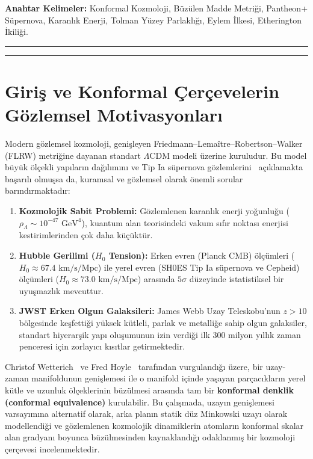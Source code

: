 \documentclass[11pt,a4paper]{article}
\begin{document}
\vspace{1em}
\noindent\textbf{Anahtar Kelimeler:} Konformal Kozmoloji, Büzülen Madde Metriği, Pantheon+ Süpernova, Karanlık Enerji, Tolman Yüzey Parlaklığı, Eylem İlkesi, Etherington İkiliği.

\vspace{1em}
\hrule
\vspace{0.8em}
\tableofcontents
\vspace{0.8em}
\hrule
\vspace{1.5em}

\section{Giriş ve Konformal Çerçevelerin Gözlemsel Motivasyonları}
\label{sec:giris_kozmo}

Modern gözlemsel kozmoloji, genişleyen Friedmann--Lema\^itre--Robertson--Walker (FLRW) metriğine dayanan standart $\Lambda\mathrm{CDM}$ modeli üzerine kuruludur. Bu model büyük ölçekli yapıların dağılımını ve Tip Ia süpernova gözlemlerini~\cite{riess1998,perlmutter1999} açıklamakta başarılı olmuşsa da, kuramsal ve gözlemsel olarak önemli sorular barındırmaktadır:
\begin{enumerate}
    \item \textbf{Kozmolojik Sabit Problemi:} Gözlemlenen karanlık enerji yoğunluğu ($\rho_\Lambda \sim 10^{-47}\text{ GeV}^4$), kuantum alan teorisindeki vakum sıfır noktası enerjisi kestirimlerinden çok daha küçüktür.
    \item \textbf{Hubble Gerilimi ($H_0$ Tension):} Erken evren (Planck CMB) ölçümleri ($H_0 \approx 67.4\text{ km/s/Mpc}$) ile yerel evren (SH0ES Tip Ia süpernova ve Cepheid) ölçümleri ($H_0 \approx 73.0\text{ km/s/Mpc}$) arasında $5\sigma$ düzeyinde istatistiksel bir uyuşmazlık mevcuttur.
    \item \textbf{JWST Erken Olgun Galaksileri:} James Webb Uzay Teleskobu'nun $z > 10$ bölgesinde keşfettiği yüksek kütleli, parlak ve metalliğe sahip olgun galaksiler, standart hiyerarşik yapı oluşumunun izin verdiği ilk 300 milyon yıllık zaman penceresi için zorlayıcı kısıtlar getirmektedir.
\end{enumerate}

Christof Wetterich~\cite{wetterich2013} ve Fred Hoyle~\cite{hoyle1964} tarafından vurgulandığı üzere, bir uzay-zaman manifoldunun genişlemesi ile o manifold içinde yaşayan parçacıkların yerel kütle ve uzunluk ölçeklerinin büzülmesi arasında tam bir \textbf{konformal denklik (conformal equivalence)} kurulabilir. Bu çalışmada, uzayın genişlemesi varsayımına alternatif olarak, arka planın statik düz Minkowski uzayı olarak modellendiği ve gözlemlenen kozmolojik dinamiklerin atomların konformal skalar alan gradyanı boyunca büzülmesinden kaynaklandığı odaklanmış bir kozmoloji çerçevesi incelenmektedir.
\end{document}
